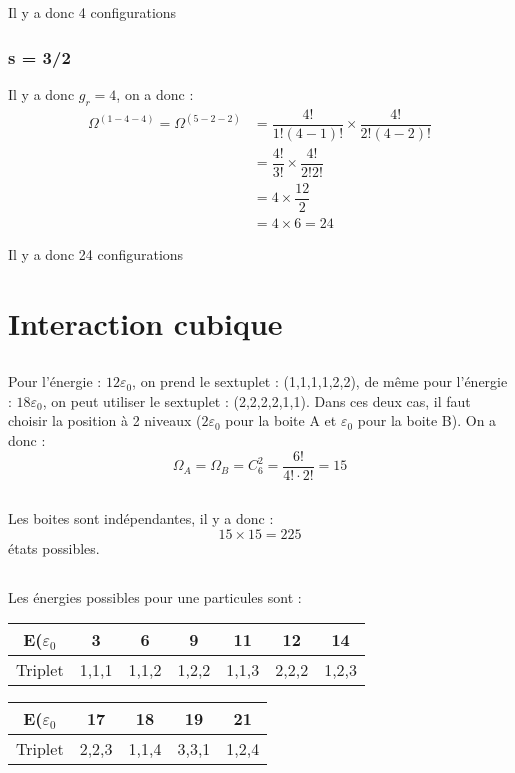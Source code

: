 \documentclass[12pt,a4paper]{article}
\begin{document}
Il y a donc 4 configurations

\subsubsection{s = 3/2}

Il y a donc \(g_r = 4\), on a donc :
\begin{align*}
	\Omega^{(1-4-4)} = \Omega^{(5-2-2)} &= \dfrac{4!}{1!(4-1)!} \times \dfrac{4!}{2!(4-2)!}\\
	&= \dfrac{4!}{3!} \times \dfrac{4!}{2!2!}\\
	&= 4 \times \dfrac{12}{2}\\
	&= 4 \times 6 = 24
\end{align*}

Il y a donc 24 configurations

\section{Interaction cubique}

\subsection{}

Pour l'énergie : \(12\varepsilon_0\), on prend le sextuplet : (1,1,1,1,2,2), de même pour l'énergie : \(18\varepsilon_0\), on peut utiliser le sextuplet : (2,2,2,2,1,1).
Dans ces deux cas, il faut choisir la position à 2 niveaux  (\(2\varepsilon_0\) pour la boite A et \(\varepsilon_0\) pour la boite B).
On a donc :
\[
	\Omega_A = \Omega_B = C_6^2 = \dfrac{6!}{4! \cdot 2!} = 15
\]

\subsection{}

Les boites sont indépendantes, il y a donc :
\[
	15 \times 15 = 225
\]
états possibles.

\subsection{}

Les énergies possibles pour une particules sont :

\begin{center}

	\begin{tabular}{|c|c|c|c|c|c|c|}
		\hline 
		E(\(\varepsilon_0\) & 3 & 6 & 9 & 11 & 12 & 14 \\ 
		\hline 
		Triplet & 1,1,1 & 1,1,2 & 1,2,2 & 1,1,3 & 2,2,2 & 1,2,3 \\ 
		\hline 
	\end{tabular}

	\begin{tabular}{|c|c|c|c|c|}
		\hline
		E(\(\varepsilon_0\) & 17 & 18 & 19 & 21 \\
		\hline
		Triplet & 2,2,3 & 1,1,4 & 3,3,1 & 1,2,4\\
		\hline
	\end{tabular}

\end{center}
\end{document}
